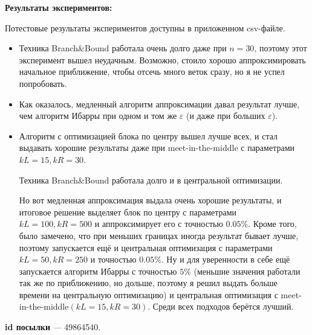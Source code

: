 	\textbf{Результаты экспериментов:}
	
	Потестовые результаты экспериментов доступны в приложенном csv-файле. 
	\begin{itemize}
		\item Техника Branch\&Bound работала очень долго даже при $n=30$, поэтому этот эксперимент вышел неудачным. Возможно, стоило хорошо аппроксимировать начальное приближение, чтобы отсечь много веток сразу, но я не успел попробовать.
		
		\item Как оказалось, медленный алгоритм аппроксимации давал результат лучше, чем алгоритм Ибарры при одном и том же $\varepsilon$ (и даже при больших $\varepsilon$). 
		
		\item Алгоритм с оптимизацией блока по центру вышел лучше всех, и стал выдавать хорошие результаты даже при meet-in-the-middle с параметрами $kL=15, kR=30$. 
		
		Техника Branch\&Bound работала долго и в центральной оптимизации. 
		
		Но вот медленная аппроксимация выдала очень хорошие результаты, и итоговое решение выделяет блок по центру с параметрами $kL=100, kR=500$ и аппроксимирует его с точностью $0.05\%$. Кроме того, было замечено, что при меньших границах иногда результат бывает лучше, поэтому запускается ещё и центральная оптимизация с параметрами $kL=50, kR=250$ и точностью $0.05\%$. Ну и для уверенности в себе ещё запускается алгоритм Ибарры с точностью $5\%$ (меньшие значения работали так же по приближению, но дольше, поэтому я решил выдать больше времени на центральную оптимизацию) и центральная оптимизация с meet-in-the-middle$(kL=15, kR=30)$. Среди всех подходов берётся лучший.
	\end{itemize}

	\textbf{id посылки} --- 49864540.

